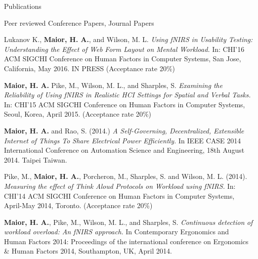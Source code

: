 \documentclass{resume} %
\begin{document}
\begin{rSection}{Publications}
\begin{rSubsection}{ }{ }{ }{Peer reviewed Conference Papers, Journal Papers}
\item Lukanov K., \textbf{Maior, H. A.}, and Wilson, M. L. \emph{Using fNIRS in Usability Testing: Understanding the Effect of Web Form Layout on Mental Workload.} In: CHI'16 ACM SIGCHI Conference on Human Factors in Computer Systems, San Jose, California, May 2016. IN PRESS (Acceptance rate 20\%)

\item \textbf{Maior, H. A.} Pike, M., Wilson, M. L., and Sharples, S. \emph{Examining the Reliability of Using fNIRS in Realistic HCI Settings for Spatial and Verbal Tasks.} In: CHI'15 ACM SIGCHI Conference on Human Factors in Computer Systems, Seoul, Korea, April 2015. (Acceptance rate 20\%)

\item \textbf{Maior, H. A.} and Rao, S. (2014.) \emph{A Self-Governing, Decentralized, Extensible Internet of Things To Share Electrical Power Efficiently.} In IEEE CASE 2014 International Conference on Automation Science and Engineering, 18th August 2014. Taipei Taiwan.

\item Pike, M., \textbf{Maior, H. A.}, Porcheron, M., Sharples, S. and Wilson, M. L. (2014). \emph{Measuring the effect of Think Aloud Protocols on Workload using fNIRS.} In: CHI'14 ACM SIGCHI Conference on Human Factors in Computer Systems, April-May 2014, Toronto. (Acceptance rate 20\%)

\item \textbf{Maior, H. A.}, Pike, M., Wilson, M. L., and Sharples, S. \emph{Continuous detection of workload overload: An fNIRS approach.} In Contemporary Ergonomics and Human Factors 2014: Proceedings of the international conference on Ergonomics \& Human Factors 2014, Southampton, UK, April 2014.
\end{rSubsection}


\end{rSection}
\end{document}
